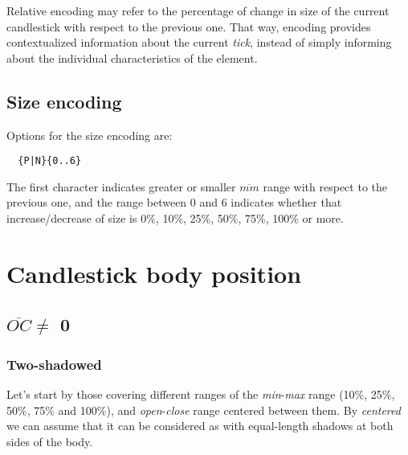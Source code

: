 \documentclass[]{article}
\begin{document}
Relative encoding may refer to the percentage of change in size of the current candlestick with respect to the previous one. That way, encoding provides contextualized information about the current \textit{tick}, instead of simply informing about the individual characteristics of the element.

\subsection{Size encoding}

Options for the size encoding are:

\begin{verbatim}
  {P|N}{0..6}
\end{verbatim}

The first character indicates greater or smaller $\overline{mm}$ range with respect to the previous one, and the range between 0 and 6 indicates whether that increase/decrease of size is 0\%, 10\%, 25\%, 50\%, 75\%, 100\% or more.

\section{Candlestick body position}

\subsection{$\overline{OC} \neq$  0}

\subsubsection{Two-shadowed}

Let's start by those covering different ranges of the \textit{min}-\textit{max} range (10\%, 25\%, 50\%, 75\% and 100\%), and \textit{open}-\textit{close} range centered between them. By \textit{centered} we can assume that it can be considered as with equal-length shadows at both sides of the body.
\end{document}
